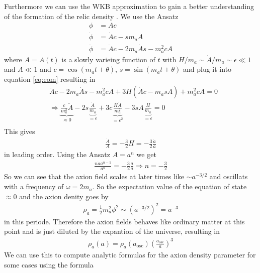 \documentclass[a4paper]{article}
\begin{document}
Furthermore we can use the WKB approximation to gain a better understanding of the formation of the relic density \cite[Chap 4.3.1, Page 28]{MarshAxionCosmo}.
We use the Ansatz
\begin{align*}
    \phi &= A c \\
    \dot{\phi} &= \dot{A} c - s m_a A \\
    \ddot{\phi} &= \ddot{A} c - 2 m_a \dot{A} s - m_a^2 c A
\end{align*}
where $A = A(t)$ is a slowly varieing function of $t$ with $H / m_a \sim \dot{A} / m_a \sim \epsilon \ll 1$ and $\ddot{A} \ll 1$
and $c = \cos(m_a t + \theta)$, $s = \sin(m_a t + \theta) $
and plug it into equation \ref{eq:eom}
resulting in
\begin{align*}
    &\ddot{A} c - 2 m_a \dot{A} s - m_a^2 c A + 3 H ( \dot{A} c - m_a s A) + m_a^2 c A = 0 \\
    &\Rightarrow \underbrace{\frac{c}{m_a^2} \ddot{A}}_{\approx 0} - 2 s \underbrace{\frac{\dot{A}}{m_a}}_{= \epsilon} + 3c \underbrace{\frac{H \dot{A}}{m_a^2}}_{= \epsilon^2} - 3 s A \underbrace{\frac{H}{m_a}}_{= \epsilon} = 0 \\
\end{align*}
This gives
\begin{align*}
    \frac{\dot{A}}{A} = - \frac{3}{2} H = - \frac{3}{2} \frac{\dot{a}}{a}
\end{align*}
in leading order.
Using the Ansatz $A = a^n$ we get
\begin{align*}
    \frac{n \dot{a} a^{n - 1}}{a^n} = - \frac{3}{2} \frac{\dot{a}}{a} \Rightarrow n = - \frac{3}{2}
\end{align*}
So we can see that the axion field scales at later times like $\sim a^{-3/2}$
and oscillats with a frequency of $\omega = 2m_a$. So
the expectation value of the equation of state $\approx 0$ and the axion denity goes by
\begin{align*}
    \rho_a = \frac{1}{2}m_a^2\phi^2 \sim \left(a^{-3/2}\right)^2 = a^{-3}
\end{align*}
in this periode. Therefore the axion fields behaves like ordinary matter at this point and
is just diluted by the expantion of the universe, resulting in \cite[Chap. 4.3.1, Page 28]{MarshAxionCosmo}
\begin{align}
    \label{eq:wkb_axion_denity}
    \rho_a(a) = \rho_a(a_\mathrm{osc}) \left( \frac{a_\mathrm{osc}}{a} \right)^3
\end{align}
We can use this to compute analytic formulas for the axion density parameter for some cases \cite[Chap 4.3.1, Page 28]{MarshAxionCosmo} using the formula
\end{document}
